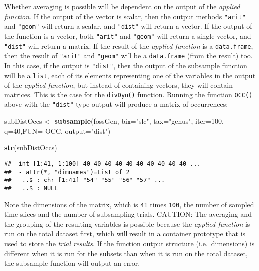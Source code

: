 \documentclass[]{article}
\newenvironment{Shaded}{\begin{snugshade}}{\end{snugshade}}
\newcommand{\KeywordTok}[1]{\textcolor[rgb]{0.13,0.29,0.53}{\textbf{{#1}}}}
\newcommand{\DataTypeTok}[1]{\textcolor[rgb]{0.13,0.29,0.53}{{#1}}}
\newcommand{\DecValTok}[1]{\textcolor[rgb]{0.00,0.00,0.81}{{#1}}}
\newcommand{\StringTok}[1]{\textcolor[rgb]{0.31,0.60,0.02}{{#1}}}
\newcommand{\NormalTok}[1]{{#1}}
\begin{document}
Whether averaging is possible will be dependent on the output of the
\emph{applied function}. If the output of the vector is scalar, then the
output methods \texttt{"arit"} and \texttt{"geom"} will return a scalar,
and \texttt{"dist"} will return a vector. If the output of the function
is a vector, both \texttt{"arit"} and \texttt{"geom"} will return a
single vector, and \texttt{"dist"} will return a matrix. If the result
of the \emph{applied function} is a \texttt{data.frame}, then the result
of \texttt{"arit"} and \texttt{"geom"} will be a \texttt{data.frame}
(from the result) too. In this case, if the output is \texttt{"dist"},
then the output of the subsample function will be a \texttt{list}, each
of its elements representing one of the variables in the output of the
\emph{applied function}, but instead of containing vectors, they will
contain matrices. This is the case for the \texttt{divDyn()} function.
Running the function \texttt{OCC()} above with the \texttt{"dist"} type
output will produce a matrix of occurrences:

\begin{Shaded}
\begin{Highlighting}[]
\NormalTok{subDistOccs <-}\StringTok{ }\KeywordTok{subsample}\NormalTok{(fossGen, }\DataTypeTok{bin=}\StringTok{"slc"}\NormalTok{, }\DataTypeTok{tax=}\StringTok{"genus"}\NormalTok{, }
  \DataTypeTok{iter=}\DecValTok{100}\NormalTok{, }\DataTypeTok{q=}\DecValTok{40}\NormalTok{,}\DataTypeTok{FUN=} \NormalTok{OCC, }\DataTypeTok{output=}\StringTok{"dist"}\NormalTok{)}
\end{Highlighting}
\end{Shaded}

\begin{Shaded}
\begin{Highlighting}[]
\KeywordTok{str}\NormalTok{(subDistOccs)}
\end{Highlighting}
\end{Shaded}

\begin{verbatim}
##  int [1:41, 1:100] 40 40 40 40 40 40 40 40 40 40 ...
##  - attr(*, "dimnames")=List of 2
##   ..$ : chr [1:41] "54" "55" "56" "57" ...
##   ..$ : NULL
\end{verbatim}

Note the dimensions of the matrix, which is \texttt{41} times
\texttt{100}, the number of sampled time slices and the number of
subsampling trials. CAUTION: The averaging and the grouping of the
resulting variables is possible because the \emph{applied function} is
run on the total dataset first, which will result in a container
prototype that is used to store the \emph{trial results}. If the
function output structure (i.e.~dimensions) is different when it is run
for the subsets than when it is run on the total dataset, the subsample
function will output an error.
\end{document}
